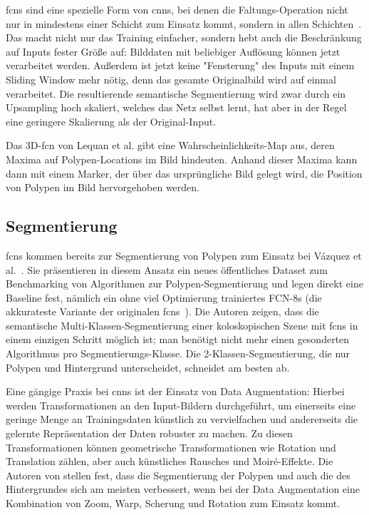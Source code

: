 \glspl{fcn} sind eine spezielle Form von \glspl{cnn}, bei denen die Faltungs-Operation nicht nur in mindestens einer Schicht zum Einsatz kommt, sondern in allen Schichten~\cite{Long.2015}.
Das macht nicht nur das Training einfacher, sondern hebt auch die Beschränkung auf Inputs fester Größe auf:
Bilddaten mit beliebiger Auflösung können jetzt verarbeitet werden.
Außerdem ist jetzt keine "Fensterung" des Inputs mit einem Sliding Window mehr nötig, denn das gesamte Originalbild wird auf einmal verarbeitet.
Die resultierende semantische Segmentierung wird zwar durch ein Upsampling hoch skaliert, welches das Netz selbst lernt, hat aber in der Regel eine geringere Skalierung als der Original-Input.

Das 3D-\gls{fcn} von Lequan et al. gibt eine Wahrscheinlichkeits-Map aus, deren Maxima auf Polypen-Locations im Bild hindeuten.
Anhand dieser Maxima kann dann mit einem Marker, der über das ursprüngliche Bild gelegt wird, die Position von Polypen im Bild hervorgehoben werden.

\subsection{Segmentierung}

\glspl{fcn} kommen bereits zur Segmentierung von Polypen zum Einsatz bei Vázquez et al.~\cite{Vazquez.2017}.
Sie präsentieren in diesem Ansatz ein neues öffentliches Dataset zum Benchmarking von Algorithmen zur Polypen-Segmentierung und legen direkt eine Baseline fest, nämlich ein ohne viel Optimierung trainiertes FCN-8s (die akkurateste Variante der originalen \glspl{fcn}~\cite{Long.2015}).
Die Autoren zeigen, dass die semantische Multi-Klassen-Segmentierung einer koloskopischen Szene mit \glspl{fcn} in einem einzigen Schritt möglich ist; man benötigt nicht mehr einen gesonderten Algorithmus pro Segmentierungs-Klasse.
Die 2-Klassen-Segmentierung, die nur Polypen und Hintergrund unterscheidet, schneidet am besten ab.

Eine gängige Praxis bei \glspl{cnn} ist der Einsatz von Data Augmentation:
Hierbei werden Transformationen an den Input-Bildern durchgeführt, um einerseits eine geringe Menge an Trainingsdaten künstlich zu vervielfachen und andererseits die gelernte Repräsentation der Daten robuster zu machen.
Zu diesen Transformationen können geometrische Transformationen wie Rotation und Translation zählen, aber auch künstliches Rausches und Moiré-Effekte.
Die Autoren von \cite{Vazquez.2017} stellen fest, dass die Segmentierung der Polypen und auch die des Hintergrundes sich am meisten verbessert, wenn bei der Data Augmentation eine Kombination von Zoom, Warp, Scherung und Rotation zum Einsatz kommt.

